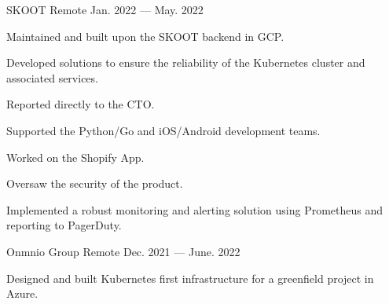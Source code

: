 

\begin{cventries}

    {SKOOT}
    {Remote}
    {Jan. 2022 — May. 2022}
    {
        \begin{cvitems}
        \item{Maintained and built upon the SKOOT backend in GCP.}
        \item{Developed solutions to ensure the reliability of the Kubernetes cluster and associated services.}
        \item{Reported directly to the CTO.}
        \item{Supported the Python/Go and iOS/Android development teams.}
	\item{Worked on the Shopify App.}
        \item{Oversaw the security of the product.}
	\item{Implemented a robust monitoring and alerting solution using Prometheus and reporting to PagerDuty.}
        \end{cvitems}
    }
    {Onmnio Group}
    {Remote}
    {Dec. 2021 — June. 2022}
    {
        \begin{cvitems}
        \item{Designed and built Kubernetes first infrastructure for a greenfield project in Azure.}

\end{cvitems}}
\end{cventries}

